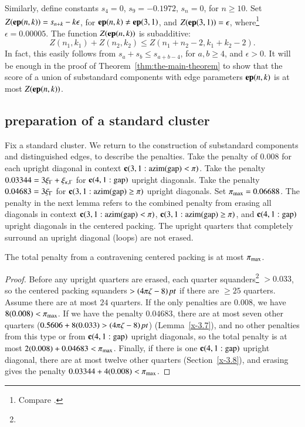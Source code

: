Similarly, define constants $s_4=0$, $s_9 = -0.1972$, $s_{n}=0$, for
$n\ge10$.  Set $Z({\operatorname{\bf ep}}{(n,k)}) = s_{n+k}-k\epsilon$, for ${\operatorname{\bf ep}}{(n,k)}\ne {\operatorname{\bf ep}}{(3,1)}$, and
$Z({\operatorname{\bf ep}}{(3,1)})=\epsilon$, where\footnote{Compare .} %
 $\epsilon=0.00005$. The function
$Z({\operatorname{\bf ep}}{(n,k)})$ is subadditive:
    $$Z(n_1,k_1)+Z(n_2,k_2) \le Z(n_1+n_2-2,k_1+k_2-2).$$
In fact, this easily follows from $s_a+s_b\le s_{a+b-4}$, for $a,b\ge
4$, and $\epsilon>0$. It will be enough in the proof of
Theorem~\ref{thm:the-main-theorem} to show that the score of a union of
substandard components with edge parameters ${\operatorname{\bf ep}}{(n,k)}$ is at most $Z({\operatorname{\bf ep}}{(n,k)})$.


\subsection{preparation of a standard cluster} %
   \label{sec:prep-cluster}

Fix a standard cluster.  We return to the construction of
substandard components and distinguished edges, to describe the penalties.
Take the penalty of $0.008$ for each  upright
diagonal in context ${\operatorname{\bf c}}{(3,1: {\operatorname{azim}}({\operatorname{gap}}) <\pi)}$. 
Take the penalty $0.03344 = 3\xi_\Gamma+\xi_{\kappa,\Gamma}$ for ${\operatorname{\bf c}}{(4,1:{\operatorname{gap}})}$
upright diagonals. Take the penalty $0.04683=3\xi_\Gamma$ for
${\operatorname{\bf c}}{(3,1: {\operatorname{azim}}({\operatorname{gap}}) \ge \pi)}$ upright diagonals. Set $\pi_{\max}=0.06688$. The penalty
in the next lemma refers to the combined penalty from erasing all
diagonals in context ${\operatorname{\bf c}}{(3,1: {\operatorname{azim}}({\operatorname{gap}}) <\pi)}$, ${\operatorname{\bf c}}{(3,1: {\operatorname{azim}}({\operatorname{gap}}) \ge \pi)}$, and ${\operatorname{\bf c}}{(4,1:{\operatorname{gap}})}$ upright diagonals in
the centered packing. The upright quarters that completely
surround an upright diagonal (loops) are not erased.

\begin{lemma}
The total penalty from a contravening centered packing is at most
$\pi_{\max}$.
\end{lemma}

\begin{proof}
Before any upright quarters are erased, each quarter
squanders\footnote{} %
$>0.033$, so the centered packing squanders $>(4\pi\zeta-8)\,\hbox{\it pt}$ if there
are $\ge25$ quarters.  Assume there are at most $24$ quarters. If
the only penalties are $0.008$, we have $8(0.008)<\pi_{\max}$. If we
have the penalty $0.04683$, there are at most seven other quarters
($0.5606+8(0.033)>(4\pi\zeta-8)\,\hbox{\it pt}$) (Lemma~\ref{x-3.7}), and no other
penalties from this type or from ${\operatorname{\bf c}}{(4,1:{\operatorname{gap}})}$ upright diagonals, so
the total penalty is at most $2(0.008)+ 0.04683 < \pi_{\max}$.
Finally, if there is one ${\operatorname{\bf c}}{(4,1:{\operatorname{gap}})}$ upright diagonal, there are
at most twelve other quarters (Section~\ref{x-3.8}), and erasing
gives the penalty $0.03344+4 (0.008)<\pi_{\max}$.
\end{proof}

